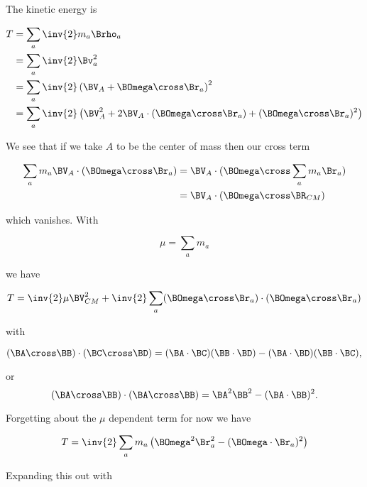 The kinetic energy is

\begin{align*}
T 
&= \sum_a \inv{2} m_a \Brho_a \\
&= \sum_a \inv{2} \Bv_a^2 \\
&= 
\sum_a \inv{2} \left(
\BV_A + \BOmega \cross \Br_a
\right)^2 \\
&=
\sum_a \inv{2} \left( \BV_A^2 +
2 \BV_A \cdot (\BOmega \cross \Br_a)
+ (\BOmega \cross \Br_a)^2
\right)
\end{align*}

We see that if we take $A$ to be the center of mass then our cross term

\begin{align*}
\sum_a m_a \BV_A \cdot (\BOmega \cross \Br_a)
&=
\BV_A \cdot (\BOmega \cross \sum_a m_a \Br_a) \\
&=
\BV_A \cdot (\BOmega \cross \BR_{CM} )
\end{align*}

which vanishes.  With 

\begin{equation}\label{eqn:rigidBodyMotion:380}
\mu = \sum_a m_a
\end{equation}

we have

\begin{equation}\label{eqn:rigidBodyMotion:400}
T = \inv{2} \mu \BV_{CM}^2+ \inv{2} \sum_a 
(\BOmega \cross \Br_a) \cdot (\BOmega \cross \Br_a) 
\end{equation}

with

\begin{equation}\label{eqn:rigidBodyMotion:420}
(\BA \cross \BB) \cdot (\BC \cross \BD) = (\BA \cdot \BC) (\BB \cdot \BD) -(\BA \cdot \BD) (\BB \cdot \BC),
\end{equation}

or
\begin{equation}\label{eqn:rigidBodyMotion:420b}
(\BA \cross \BB) \cdot (\BA \cross \BB) = \BA^2 \BB^2 - (\BA \cdot \BB)^2.
\end{equation}

Forgetting about the $\mu$ dependent term for now we have

\begin{equation}\label{eqn:rigidBodyMotion:440}
T = \inv{2} \sum_a m_a \left( \BOmega^2 \Br_a^2 - (\BOmega \cdot \Br_a)^2
\right)
\end{equation}

Expanding this out with 

